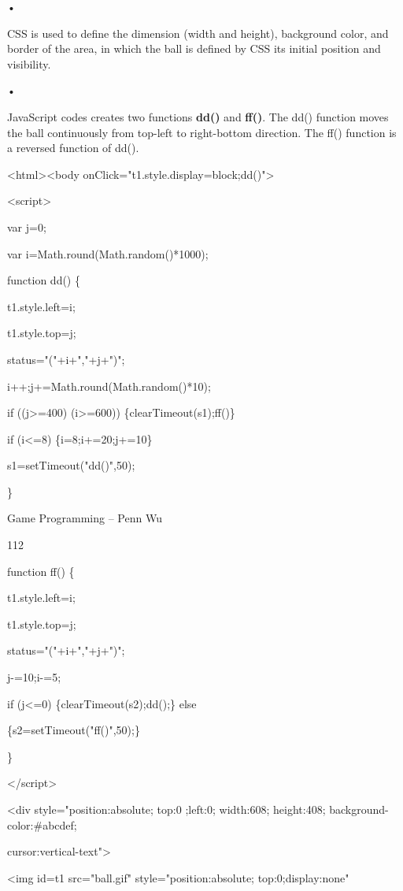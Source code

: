 \documentclass[
]{article}
\begin{document}
•

CSS is used to define the dimension (width and height), background
color, and border of the area, in which the ball is defined by CSS its
initial position and visibility.

•

JavaScript codes creates two functions \textbf{dd()} and \textbf{ff()}.
The dd() function moves the ball continuously from top-left to
right-bottom direction. The ff() function is a reversed function of
dd().

\textless html\textgreater\textless body
onClick="t1.style.display=\textquotesingle block\textquotesingle;dd()"\textgreater{}

\textless script\textgreater{}

var j=0;

var i=Math.round(Math.random()*1000);

function dd() \{

t1.style.left=i;

t1.style.top=j;

status="("+i+","+j+")";

i++;j+=Math.round(Math.random()*10);

if ((j\textgreater=400) \textbar\textbar{} (i\textgreater=600))
\{clearTimeout(s1);ff()\}

if (i\textless=8) \{i=8;i+=20;j+=10\}

s1=setTimeout("dd()",50);

\}

Game Programming -- Penn Wu

112

\protect\hypertarget{index_split_008.htmlux5cux23p113}{}{}function ff()
\{

t1.style.left=i;

t1.style.top=j;

status="("+i+","+j+")";

j-=10;i-=5;

if (j\textless=0) \{clearTimeout(s2);dd();\} else

\{s2=setTimeout("ff()",50);\}

\}

\textless/script\textgreater{}

\textless div style="position:absolute; top:0 ;left:0; width:608;
height:408; background-color:\#abcdef;

cursor:vertical-text"\textgreater{}

\textless img id=t1 src="ball.gif" style="position:absolute;
top:0;display:none"
\end{document}
